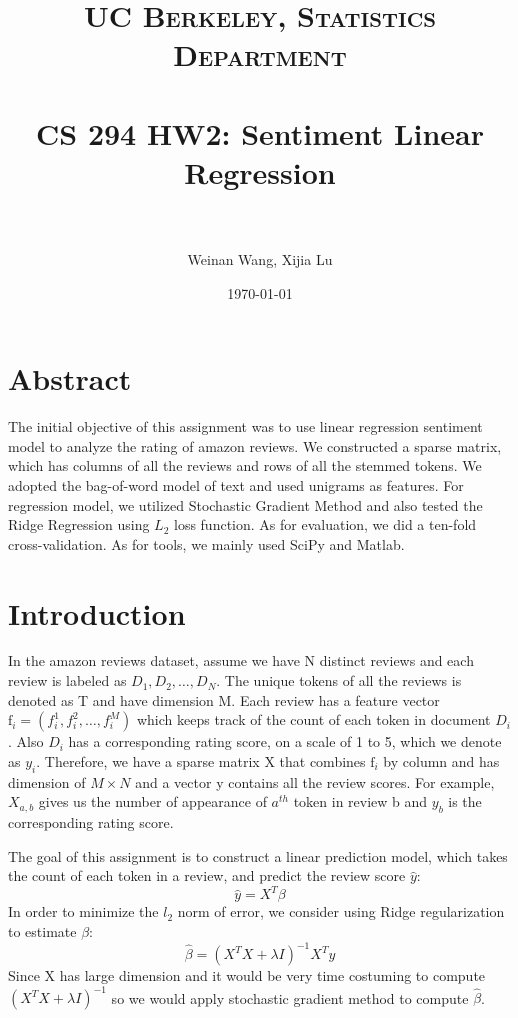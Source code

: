 \documentclass[paper=a4, fontsize=11pt]{scrartcl} %
\title{	
\normalfont \normalsize 
\textsc{UC Berkeley, Statistics Department} \\ [25pt] %
\horrule{0.5pt} \\[0.4cm] %
\huge  CS 294 HW2: Sentiment Linear Regression\\ %
\horrule{2pt} \\[0.5cm] %
}
\author{Weinan Wang, Xijia Lu} %
\date{\normalsize\today} %
\numberwithin{equation}{section} %
\numberwithin{figure}{section} %
\numberwithin{table}{section} %
\begin{document}
\maketitle %
\def\wl{\par \vspace{\baselineskip}}

\section{Abstract}
The initial objective of this assignment was to use linear regression sentiment model to analyze the rating of amazon reviews. We constructed a sparse matrix, which has columns of all the reviews and rows of all the stemmed tokens. We adopted the bag-of-word model of text and used unigrams as features. For regression model, we utilized Stochastic Gradient Method and also tested the Ridge Regression using \(L_{2}\) loss function. As for evaluation, we did a ten-fold cross-validation. As for tools, we mainly used SciPy and Matlab. 

\section{Introduction}
In the amazon reviews dataset, assume we have N distinct reviews and each review is labeled as $D_{1}, D_{2}, \ldots , D_{N}$. The unique tokens of all the reviews is denoted as T and have dimension M. Each review has a feature vector $\mathrm{f}_{i} = (f^{1}_{i}, f^{2}_{i}, \ldots , f^{M}_{i})$ which keeps track of the count of each token in document $D_{i}$. Also $D_{i}$ has a corresponding rating score, on a scale of 1 to 5, which we denote as $y_{i}$. Therefore, we have a sparse matrix X that combines $\mathrm{f}_{i}$ by column and has dimension of $M \times N$ and a vector y contains all the review scores. For example, $X_{a,b}$ gives us the number of appearance of $a^{th}$ token in review b and $y_{b}$ is the corresponding rating score. 

The goal of this assignment is to construct a linear prediction model, which takes the count of each token in a review, and predict the review score $\hat{y}$:
\begin{equation}
 \hat{y} = X^{T}\beta
 \end{equation}
 In order to minimize the $l_{2}$ norm of error, we consider using Ridge regularization to estimate $\beta$: 
\begin{equation}
\hat{\beta} = {(X^{T}X+\lambda I)}^{-1}X^{T}y 
\end{equation}
Since X has large dimension and it would be very time costuming to compute ${(X^{T}X+\lambda I)}^{-1}$ so we would apply stochastic gradient method to compute $\hat{\beta}$. 
\end{document}
